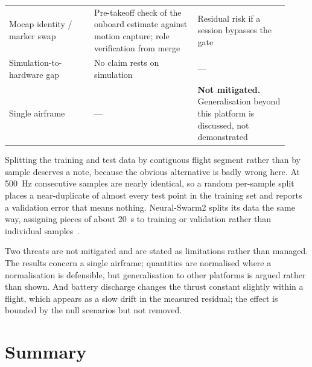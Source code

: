 \begin{table}[t]
\begin{tabular}{@{}p{0.28\linewidth}p{0.34\linewidth}p{0.30\linewidth}@{}}
    Mocap identity / marker swap & Pre-takeoff check of the onboard estimate against motion capture; role verification from merge & Residual risk if a session bypasses the gate \\
    Simulation-to-hardware gap & No claim rests on simulation & --- \\
    Single airframe & --- & \textbf{Not mitigated.} Generalisation beyond this platform is discussed, not demonstrated \\
    \bottomrule
  \end{tabular}
\end{table}

Splitting the training and test data by contiguous flight segment rather than by sample deserves a
note, because the obvious alternative is badly wrong here. At \SI{500}{\hertz} consecutive samples
are nearly identical, so a random per-sample split places a near-duplicate of almost every test
point in the training set and reports a validation error that means nothing. Neural-Swarm2 splits
its data the same way, assigning pieces of about \SI{20}{\second} to training or validation rather
than individual samples~\cite{shi2022neuralswarm2}.

Two threats are not mitigated and are stated as limitations rather than managed. The results
concern a single airframe; quantities are normalised where a normalisation is defensible, but
generalisation to other platforms is argued rather than shown. And battery discharge changes the
thrust constant slightly within a flight, which appears as a slow drift in the measured residual;
the effect is bounded by the null scenarios but not removed.

\section{Summary}
\label{sec:setup-summary}

